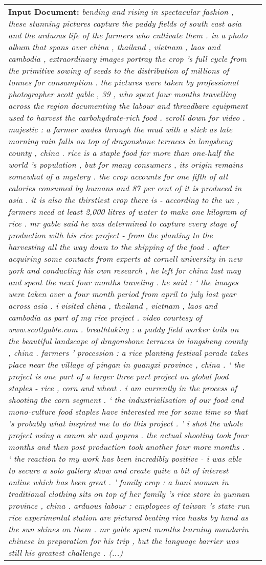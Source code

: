 \documentclass[11pt,a4paper]{article}
\begin{document}
\begin{figure*}
\centering
\begin{tabularx}{\textwidth}{|X|l|}
\hline
\textbf{Input Document:} \emph{bending and rising in spectacular fashion , these stunning pictures capture the paddy fields of south east asia and the arduous life of the farmers who cultivate them . in a photo album that spans over china , thailand , vietnam , laos and cambodia , extraordinary images portray the crop 's full cycle from the primitive sowing of seeds to the distribution of millions of tonnes for consumption . the pictures were taken by professional photographer scott gable , 39 , who spent four months travelling across the region documenting the labour and threadbare equipment used to harvest the carbohydrate-rich food . scroll down for video . majestic : a farmer wades through the mud with a stick as late morning rain falls on top of dragonsbone terraces in longsheng county , china . rice is a staple food for more than one-half the world 's population , but for many consumers , its origin remains somewhat of a mystery . the crop accounts for one fifth of all calories consumed by humans and 87 per cent of it is produced in asia . it is also the thirstiest crop there is - according to the un , farmers need at least 2,000 litres of water to make one kilogram of rice . mr gable said he was determined to capture every stage of production with his rice project - from the planting to the harvesting all the way down to the shipping of the food . after acquiring some contacts from experts at cornell university in new york and conducting his own research , he left for china last may and spent the next four months traveling . he said : ` the images were taken over a four month period from april to july last year across asia . i visited china , thailand , vietnam , laos and cambodia as part of my rice project . video courtesy of www.scottgable.com . breathtaking : a paddy field worker toils on the beautiful landscape of dragonsbone terraces in longsheng county , china . farmers ' procession : a rice planting festival parade takes place near the village of pingan in guangxi province , china . ` the project is one part of a larger three part project on global food staples - rice , corn and wheat . i am currently in the process of shooting the corn segment . ` the industrialisation of our food and mono-culture food staples have interested me for some time so that 's probably what inspired me to do this project . ' i shot the whole project using a canon slr and gopros . the actual shooting took four months and then post production took another four more months . ` the reaction to my work has been incredibly positive - i was able to secure a solo gallery show and create quite a bit of interest online which has been great . ' family crop : a hani woman in traditional clothing sits on top of her family 's rice store in yunnan province , china . arduous labour : employees of taiwan 's state-run rice experimental station are pictured beating rice husks by hand as the sun shines on them . mr gable spent months learning mandarin chinese in preparation for his trip , but the language barrier was still his greatest challenge . (...)
}
\end{tabularx}
\end{figure*}
\end{document}
